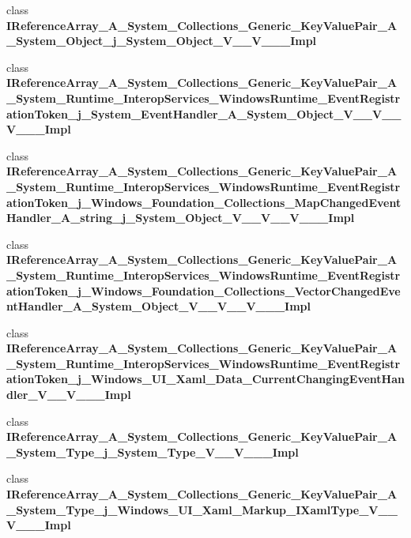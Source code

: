 \begin{DoxyCompactItemize}
\item 
class {\bfseries I\+Reference\+Array\+\_\+\+A\+\_\+\+System\+\_\+\+Collections\+\_\+\+Generic\+\_\+\+Key\+Value\+Pair\+\_\+\+A\+\_\+\+System\+\_\+\+Object\+\_\+j\+\_\+\+System\+\_\+\+Object\+\_\+\+V\+\_\+\+\_\+\+V\+\_\+\+\_\+\+\_\+\+Impl}
\item 
class {\bfseries I\+Reference\+Array\+\_\+\+A\+\_\+\+System\+\_\+\+Collections\+\_\+\+Generic\+\_\+\+Key\+Value\+Pair\+\_\+\+A\+\_\+\+System\+\_\+\+Runtime\+\_\+\+Interop\+Services\+\_\+\+Windows\+Runtime\+\_\+\+Event\+Registration\+Token\+\_\+j\+\_\+\+System\+\_\+\+Event\+Handler\+\_\+\+A\+\_\+\+System\+\_\+\+Object\+\_\+\+V\+\_\+\+\_\+\+V\+\_\+\+\_\+\+V\+\_\+\+\_\+\+\_\+\+Impl}
\item 
class {\bfseries I\+Reference\+Array\+\_\+\+A\+\_\+\+System\+\_\+\+Collections\+\_\+\+Generic\+\_\+\+Key\+Value\+Pair\+\_\+\+A\+\_\+\+System\+\_\+\+Runtime\+\_\+\+Interop\+Services\+\_\+\+Windows\+Runtime\+\_\+\+Event\+Registration\+Token\+\_\+j\+\_\+\+Windows\+\_\+\+Foundation\+\_\+\+Collections\+\_\+\+Map\+Changed\+Event\+Handler\+\_\+\+A\+\_\+string\+\_\+j\+\_\+\+System\+\_\+\+Object\+\_\+\+V\+\_\+\+\_\+\+V\+\_\+\+\_\+\+V\+\_\+\+\_\+\+\_\+\+Impl}
\item 
class {\bfseries I\+Reference\+Array\+\_\+\+A\+\_\+\+System\+\_\+\+Collections\+\_\+\+Generic\+\_\+\+Key\+Value\+Pair\+\_\+\+A\+\_\+\+System\+\_\+\+Runtime\+\_\+\+Interop\+Services\+\_\+\+Windows\+Runtime\+\_\+\+Event\+Registration\+Token\+\_\+j\+\_\+\+Windows\+\_\+\+Foundation\+\_\+\+Collections\+\_\+\+Vector\+Changed\+Event\+Handler\+\_\+\+A\+\_\+\+System\+\_\+\+Object\+\_\+\+V\+\_\+\+\_\+\+V\+\_\+\+\_\+\+V\+\_\+\+\_\+\+\_\+\+Impl}
\item 
class {\bfseries I\+Reference\+Array\+\_\+\+A\+\_\+\+System\+\_\+\+Collections\+\_\+\+Generic\+\_\+\+Key\+Value\+Pair\+\_\+\+A\+\_\+\+System\+\_\+\+Runtime\+\_\+\+Interop\+Services\+\_\+\+Windows\+Runtime\+\_\+\+Event\+Registration\+Token\+\_\+j\+\_\+\+Windows\+\_\+\+U\+I\+\_\+\+Xaml\+\_\+\+Data\+\_\+\+Current\+Changing\+Event\+Handler\+\_\+\+V\+\_\+\+\_\+\+V\+\_\+\+\_\+\+\_\+\+Impl}
\item 
class {\bfseries I\+Reference\+Array\+\_\+\+A\+\_\+\+System\+\_\+\+Collections\+\_\+\+Generic\+\_\+\+Key\+Value\+Pair\+\_\+\+A\+\_\+\+System\+\_\+\+Type\+\_\+j\+\_\+\+System\+\_\+\+Type\+\_\+\+V\+\_\+\+\_\+\+V\+\_\+\+\_\+\+\_\+\+Impl}
\item 
class {\bfseries I\+Reference\+Array\+\_\+\+A\+\_\+\+System\+\_\+\+Collections\+\_\+\+Generic\+\_\+\+Key\+Value\+Pair\+\_\+\+A\+\_\+\+System\+\_\+\+Type\+\_\+j\+\_\+\+Windows\+\_\+\+U\+I\+\_\+\+Xaml\+\_\+\+Markup\+\_\+\+I\+Xaml\+Type\+\_\+\+V\+\_\+\+\_\+\+V\+\_\+\+\_\+\+\_\+\+Impl}

\end{DoxyCompactItemize}
